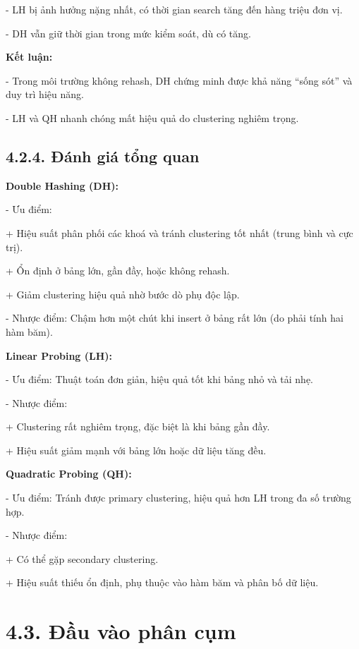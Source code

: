 \documentclass[12pt,a4paper]{report}
\begin{document}
-	LH bị ảnh hưởng nặng nhất, có thời gian search tăng đến hàng triệu đơn vị.

-	DH vẫn giữ thời gian trong mức kiểm soát, dù có tăng.

\textbf{Kết luận:}

-	Trong môi trường không rehash, DH chứng minh được khả năng “sống sót” và duy trì hiệu năng.

-	LH và QH nhanh chóng mất hiệu quả do clustering nghiêm trọng.

\subsection*{4.2.4. Đánh giá tổng quan}

\noindent \indent \textbf{Double Hashing (DH):}

- Ưu điểm:

\hspace{1cm}+	Hiệu suất phân phối các khoá và tránh clustering tốt nhất (trung bình và cực trị).

\hspace{1cm}+	Ổn định ở bảng lớn, gần đầy, hoặc không rehash.

\hspace{1cm}+	Giảm clustering hiệu quả nhờ bước dò phụ độc lập.

-	Nhược điểm: Chậm hơn một chút khi insert ở bảng rất lớn (do phải tính hai hàm băm).

	\textbf{Linear Probing (LH):}


-	Ưu điểm: Thuật toán đơn giản, hiệu quả tốt khi bảng nhỏ và tải nhẹ.


-	Nhược điểm:


\hspace{1cm}+	Clustering rất nghiêm trọng, đặc biệt là khi bảng gần đầy.


\hspace{1cm}+	Hiệu suất giảm mạnh với bảng lớn hoặc dữ liệu tăng đều.


\textbf{Quadratic Probing (QH):}

-	Ưu điểm: Tránh được primary clustering, hiệu quả hơn LH trong đa số trường hợp.

-	Nhược điểm:

\hspace{1cm}+	Có thể gặp secondary clustering.

\hspace{1cm}+	Hiệu suất thiếu ổn định, phụ thuộc vào hàm băm và phân bố dữ liệu.
\section*{4.3. Đầu vào phân cụm}
\end{document}
